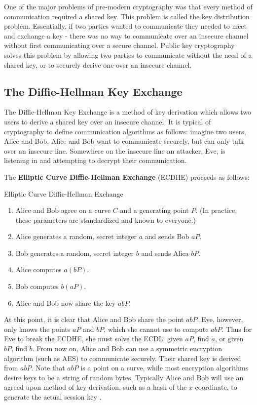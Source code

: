 \documentclass{article}
\begin{document}
One of the major problems of pre-modern cryptography was that every method of communication required a shared key.
This problem is called the key distribution problem.
Essentially, if two parties wanted to communicate they needed to meet and exchange a key - there was no way to communicate over an insecure channel without first communicating over a secure channel.
Public key cryptography solves this problem by allowing two parties to communicate without the need of a shared key, or to securely derive one over an insecure channel.

\subsection{The Diffie-Hellman Key Exchange}
The Diffie-Hellman Key Exchange is a method of key derivation which allows two users to derive a shared key over an insecure channel.
It is typical of cryptography to define communication algorithms as follows: imagine two users, Alice and Bob.
Alice and Bob want to communicate securely, but can only talk over an insecure line.
Somewhere on the insecure line an attacker, Eve, is listening in and attempting to decrypt their communication.

The \textbf{Elliptic Curve Diffie-Hellman Exchange} (ECDHE) proceeds as follows:
\begin{algorithm}
\caption{Elliptic Curve Diffie-Hellman Exchange}
\begin{enumerate}
\item Alice and Bob agree on a curve $C$ and a generating point $P$. (In practice, these parameters are standardized and known to everyone.)
\item Alice generates a random, secret integer $a$ and sends Bob $aP$.
\item Bob generates a random, secret integer $b$ and sends Alica $bP$.
\item Alice computes $a(bP)$.
\item Bob computes $b(aP)$.
\item Alice and Bob now share the key $abP$.
\end{enumerate}
\end{algorithm}

At this point, it is clear that Alice and Bob share the point $abP$.
Eve, however, only knows the points $aP$ and $bP$, which she cannot use to compute $abP$.
Thus for Eve to break the ECDHE, she must solve the ECDL: given $aP$, find $a$, or given $bP$, find $b$.
From now on, Alice and Bob can use a symmetric encryption algorithm (such as AES) to communicate securely.
Their shared key is derived from $abP$.
Note that $abP$ is a point on a curve, while most encryption algorithms desire keys to be a string of random bytes.
Typically Alice and Bob will use an agreed upon method of key derivation, such as a hash of the $x$-coordinate, to generate the actual session key \cite[\S 6.2]{washington}.
\end{document}
